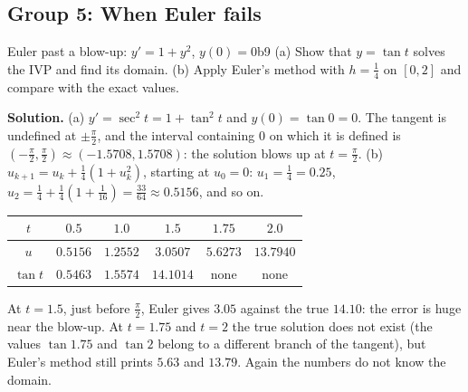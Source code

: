 \documentclass[11pt]{article}
\begin{document}
\subsection*{Group 5: When Euler fails}

\begin{exmp}{Euler past a blow-up: $y'=1+y^2$, $y(0)=0$}{b9}
(a) Show that $y=\tan t$ solves the IVP and find its domain. (b) Apply Euler's method with $h=\frac14$ on $[0,2]$ and compare with the exact values.

\textbf{Solution.} (a) $y'=\sec^2t=1+\tan^2t$ and $y(0)=\tan0=0$. The tangent is undefined at $\pm\frac\pi2$, and the interval containing $0$ on which it is defined is $\left(-\frac\pi2,\frac\pi2\right)\approx(-1.5708,1.5708)$: the solution blows up at $t=\frac\pi2$.
(b) $u_{k+1}=u_k+\frac14(1+u_k^2)$, starting at $u_0=0$: $u_1=\frac14=0.25$, $u_2=\frac14+\frac14\left(1+\frac1{16}\right)=\frac{33}{64}\approx0.5156$, and so on.
\begin{center}
\begin{tabular}{cccccc}
\toprule $t$ & $0.5$ & $1.0$ & $1.5$ & $1.75$ & $2.0$\\\midrule
$u$ & $0.5156$ & $1.2552$ & $3.0507$ & $5.6273$ & $13.7940$\\
$\tan t$ & $0.5463$ & $1.5574$ & $14.1014$ & none & none\\\bottomrule
\end{tabular}
\end{center}
At $t=1.5$, just before $\frac\pi2$, Euler gives $3.05$ against the true $14.10$: the error is huge near the blow-up. At $t=1.75$ and $t=2$ the true solution does not exist (the values $\tan1.75$ and $\tan2$ belong to a different branch of the tangent), but Euler's method still prints $5.63$ and $13.79$. Again the numbers do not know the domain.
\end{exmp}
\end{document}

